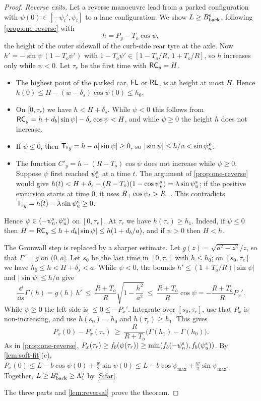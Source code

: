 \begin{proof}
\emph{Reverse exits.}
Let a reverse manoeuvre lead from a parked configuration with $\psi(0)\in[-\psi_t',\psi_t]$ to a lane configuration.
We show $L\ge B^{\rm s}_{\rm back}$, following \cref{prop:one-reverse} with
\[
  h=P_y-T_o\cos\psi ,
\]
the height of the outer sidewall of the curb-side rear tyre at the axle.
Now $h'=-\sin\psi\,(1-T_o\psi')$ with $1-T_o\psi'\in[1-T_o/R,\,1+T_o/R]$, so $h$ increases only while $\psi<0$.
Let $\tau_r$ be the first time with $\mathsf{RC}_y=H$.
\begin{itemize}[nosep]
\item The highest point of the parked car, $\mathsf{FL}$ or $\mathsf{RL}$, is at height at most $H$.
Hence $h(0)\le H-(w-\delta_s)\cos\psi(0)\le h_0$.
\item On $[0,\tau_r)$ we have $h<H+\delta_s$.
While $\psi<0$ this follows from $\mathsf{RC}_y=h+d_b|\sin\psi|-\delta_s\cos\psi<H$, and while $\psi\ge0$ the height $h$ does not increase.
\item If $\psi\le0$, then $\mathsf{T_f}_y=h-a|\sin\psi|\ge0$, so $|\sin\psi|\le h/a<\sin\psi_n^{\rm s}$.
\item The function $C'_y=h-(R-T_o)\cos\psi$ does not increase while $\psi\ge0$.
Suppose $\psi$ first reached $\psi_u^{\rm s}$ at a time $t$.
The argument of \cref{prop:one-reverse} would give $h(t)<H+\delta_s-(R-T_o)(1-\cos\psi_u^{\rm s})=\lambda\sin\psi_u^{\rm s}$; if the positive excursion starts at time $0$, it uses $R_{+}\cos\psi_t>R_{-}$.
This contradicts $\mathsf{T_r}_y=h(t)-\lambda\sin\psi_u^{\rm s}\ge0$.
\end{itemize}
Hence $\psi\in(-\psi_n^{\rm s},\psi_u^{\rm s})$ on $[0,\tau_r]$.
At $\tau_r$ we have $h(\tau_r)\ge h_1$.
Indeed, if $\psi\le0$ then $H=\mathsf{RC}_y\le h+d_b|\sin\psi|\le h(1+d_b/a)$, and if $\psi>0$ then $H<h$.

The Gronwall step is replaced by a sharper estimate.
Let $g(z)=\sqrt{a^2-z^2}/z$, so that $\Gamma'=g$ on $(0,a]$.
Let $s_0$ be the last time in $[0,\tau_r]$ with $h\le h_0$; on $[s_0,\tau_r]$ we have $h_0\le h<H+\delta_s<a$.
While $\psi<0$, the bounds $h'\le(1+T_o/R)|\sin\psi|$ and $|\sin\psi|\le h/a$ give
\[
  \frac{\dd}{\dd s}\Gamma(h)=g(h)\,h'\ \le\ \frac{R+T_o}{R}\sqrt{1-\frac{h^2}{a^2}}\ \le\ \frac{R+T_o}{R}\cos\psi=-\frac{R+T_o}{R}P_x'.
\]
While $\psi\ge0$ the left side is $\le0\le-P_x'$.
Integrate over $[s_0,\tau_r]$, use that $P_x$ is non-increasing, and use $h(s_0)=h_0$ and $h(\tau_r)\ge h_1$.
This gives
\[
  P_x(0)-P_x(\tau_r)\ \ge\ \frac{R}{R+T_o}\big(\Gamma(h_1)-\Gamma(h_0)\big).
\]
As in \cref{prop:one-reverse}, $P_x(\tau_r)\ge f_b(\psi(\tau_r))\ge\min(f_b(-\psi_n^{\rm s}),f_b(\psi_u^{\rm s}))$.
By \cref{lem:soft-fit}(c), $P_x(0)\le L-b\cos\psi(0)+\tfrac w2\sin\psi(0)\le L-b\cos\psi_{\max}+\tfrac w2\sin\psi_{\max}$.
Together, $L\ge B^{\rm s}_{\rm back}\ge\Lambda_1^{\rm s}$ by \ref{S:far}.

The three parts and \cref{lem:reversal} prove the theorem.
\end{proof}

